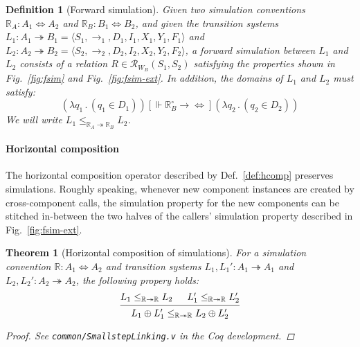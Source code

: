 \documentclass[draft,11pt]{report}
\newtheorem{definition}{Definition}
\newtheorem{theorem}{Theorem}
\newcommand{\ifr}[1]{\mathrel{[{#1}]}}
\newcommand{\que}{\circ}         %
\begin{document}
\begin{definition}[Forward simulation] \label{def:fsim} %
Given
two simulation conventions
$\mathbb{R}_A : A_1 \Leftrightarrow A_2$ and
$\mathbb{R}_B : B_1 \Leftrightarrow B_2$,
and given
the transition systems
$L_1 : A_1 \twoheadrightarrow B_1 = \langle S_1, {\rightarrow}_1, D_1, I_1, X_1, Y_1, F_1 \rangle$ and
$L_2 : A_2 \twoheadrightarrow B_2 = \langle S_2, {\rightarrow}_2, D_2, I_2, X_2, Y_2, F_2 \rangle$,
a \emph{forward simulation} between $L_1$ and $L_2$
consists of a relation
$R \in \mathcal{R}_{W_B}(S_1, S_2)$
satisfying the properties shown in
Fig.~\ref{fig:fsim} and Fig.~\ref{fig:fsim-ext}.
In addition, the domains of $L_1$ and $L_2$
must satisfy:
\[
  (\lambda q_1 \, . \, (q_1 \in D_1))
  \ifr{\Vdash \mathbb{R}_B^\que \rightarrow {\Leftrightarrow}}
  (\lambda q_2 \, . \, (q_2 \in D_2))
\]
We will write $L_1 \le_{\mathbb{R}_A \twoheadrightarrow \mathbb{R}_B} L_2$.
\end{definition}


\paragraph{Horizontal composition} %

The horizontal composition operator
described by Def.~\ref{def:hcomp}
preserves simulations.
Roughly speaking,
whenever new component instances are created
by cross-component calls,
the simulation property for the new components
can be stitched in-between
the two halves of the callers' simulation property
described in Fig.~\ref{fig:fsim-ext}.

\begin{theorem}[Horizontal composition of simulations] \label{thm:fsim-hcomp} %
For a simulation convention
$\mathbb{R} : A_1 \Leftrightarrow A_2$
and transition systems
$L_1, L_1' : A_1 \twoheadrightarrow A_1$ and
$L_2, L_2' : A_2 \twoheadrightarrow A_2$,
the following propery holds:
\[
  \begin{prooftree}
    \hypo{L_1 \le_{\mathbb{R} \twoheadrightarrow \mathbb{R}} L_2}
    \hypo{L_1' \le_{\mathbb{R} \twoheadrightarrow \mathbb{R}} L_2'}
    \infer2{L_1 \oplus L_1'
      \le_{\mathbb{R} \twoheadrightarrow \mathbb{R}}
      L_2 \oplus L_2'}
  \end{prooftree}
\]
\begin{proof}
See \texttt{common/SmallstepLinking.v}
in the Coq development.
\end{proof}
\end{theorem}
\end{document}
